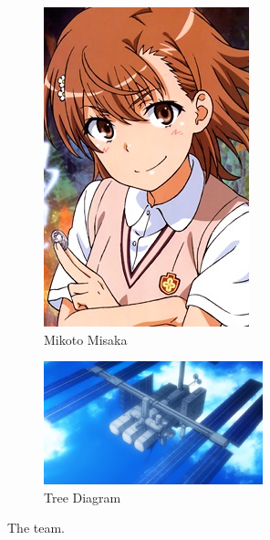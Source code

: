 \documentclass[11pt, oneside]{article}
\begin{document}
\begin{figure}[h!]
    \centering
    \begin{subfigure}[h]{0.4 \textwidth}
      \includegraphics[scale=0.4]{misaka}
      \caption{Mikoto Misaka}
    \end{subfigure}
    \begin{subfigure}[h]{0.4 \textwidth}
      \includegraphics[scale=1]{Tree_Diagram}
      \caption{Tree Diagram}
    \end{subfigure}
    \caption{The team.}
\end{figure}

\printbibliography
\end{document}
